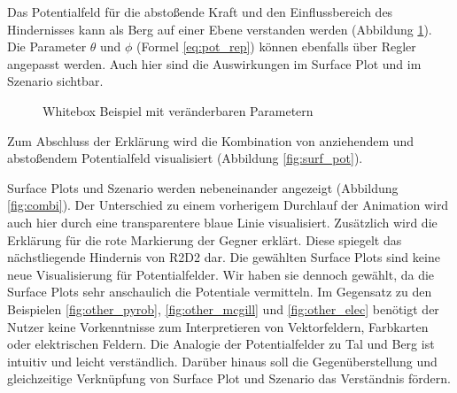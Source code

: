 Das Potentialfeld für die abstoßende Kraft und den Einflussbereich des Hindernisses kann als Berg auf einer Ebene verstanden werden (Abbildung \ref{fig:surf_rep}). Die Parameter $\theta$ und $\phi$ (Formel \ref{eq:pot_rep}) können ebenfalls über Regler angepasst werden. Auch hier sind die Auswirkungen im Surface Plot und im Szenario sichtbar.
\begin{figure}[h!]
  \centering
  \caption{Whitebox Beispiel mit veränderbaren Parametern}
  \label{fig:surf_rep}
\end{figure}
Zum Abschluss der Erklärung wird die Kombination von anziehendem und abstoßendem Potentialfeld visualisiert (Abbildung \ref{fig:surf_pot}).

Surface Plots und Szenario werden nebeneinander angezeigt  (Abbildung \ref{fig:combi}).
Der Unterschied zu einem vorherigem Durchlauf der Animation wird auch hier durch eine transparentere blaue Linie visualisiert. Zusätzlich wird die Erklärung für die rote Markierung der Gegner erklärt. Diese spiegelt das nächstliegende Hindernis von R2D2 dar. 
Die gewählten Surface Plots sind keine neue Visualisierung für Potentialfelder. Wir haben sie dennoch gewählt, da die Surface Plots sehr anschaulich die Potentiale vermitteln. Im Gegensatz zu den Beispielen \ref{fig:other_pyrob}, \ref{fig:other_mcgill} und \ref{fig:other_elec} benötigt der Nutzer keine Vorkenntnisse zum Interpretieren von Vektorfeldern, Farbkarten oder elektrischen Feldern. Die Analogie der Potentialfelder zu Tal und Berg ist intuitiv und leicht verständlich.
Darüber hinaus soll die Gegenüberstellung und gleichzeitige Verknüpfung von Surface Plot und Szenario das Verständnis fördern.

